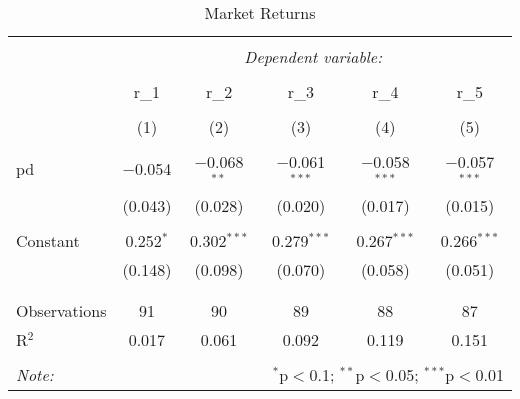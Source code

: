 
\begin{table}[!htbp] \centering 
  \caption{Market Returns} 
  \label{} 
\begin{tabular}{@{\extracolsep{5pt}}lccccc} 
\\[-1.8ex]\hline 
\hline \\[-1.8ex] 
 & \multicolumn{5}{c}{\textit{Dependent variable:}} \\ 
\cline{2-6} 
\\[-1.8ex] & r\_1 & r\_2 & r\_3 & r\_4 & r\_5 \\ 
\\[-1.8ex] & (1) & (2) & (3) & (4) & (5)\\ 
\hline \\[-1.8ex] 
 pd & $-$0.054 & $-$0.068$^{**}$ & $-$0.061$^{***}$ & $-$0.058$^{***}$ & $-$0.057$^{***}$ \\ 
  & (0.043) & (0.028) & (0.020) & (0.017) & (0.015) \\ 
  & & & & & \\ 
 Constant & 0.252$^{*}$ & 0.302$^{***}$ & 0.279$^{***}$ & 0.267$^{***}$ & 0.266$^{***}$ \\ 
  & (0.148) & (0.098) & (0.070) & (0.058) & (0.051) \\ 
  & & & & & \\ 
\hline \\[-1.8ex] 
Observations & 91 & 90 & 89 & 88 & 87 \\ 
R$^{2}$ & 0.017 & 0.061 & 0.092 & 0.119 & 0.151 \\ 
\hline 
\hline \\[-1.8ex] 
\textit{Note:}  & \multicolumn{5}{r}{$^{*}$p$<$0.1; $^{**}$p$<$0.05; $^{***}$p$<$0.01} \\ 
\end{tabular} 
\end{table} 
